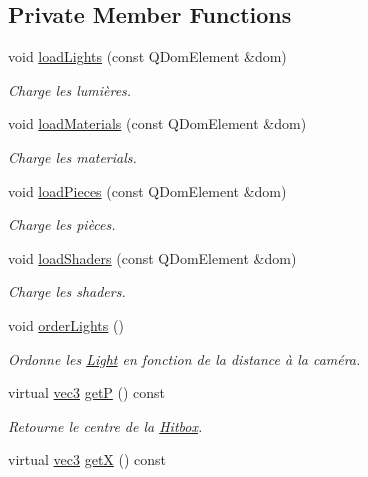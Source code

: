 \subsection*{Private Member Functions}
\begin{DoxyCompactItemize}
\item 
void \hyperlink{class_scene_a34446952ed460f5a66a90649d6f743ec}{load\+Lights} (const Q\+Dom\+Element \&dom)
\begin{DoxyCompactList}\small\item\em Charge les lumières. \end{DoxyCompactList}\item 
void \hyperlink{class_scene_a8fe39b5221775362f28c78129292e162}{load\+Materials} (const Q\+Dom\+Element \&dom)
\begin{DoxyCompactList}\small\item\em Charge les materials. \end{DoxyCompactList}\item 
void \hyperlink{class_scene_aa6d40bab1b160afc7bb84841d056a07d}{load\+Pieces} (const Q\+Dom\+Element \&dom)
\begin{DoxyCompactList}\small\item\em Charge les pièces. \end{DoxyCompactList}\item 
void \hyperlink{class_scene_a1deb5bb022836f4b585c8580246b26cb}{load\+Shaders} (const Q\+Dom\+Element \&dom)
\begin{DoxyCompactList}\small\item\em Charge les shaders. \end{DoxyCompactList}\item 
void \hyperlink{class_scene_ae6fc45f015d96191dbf775d54d6e4437}{order\+Lights} ()
\begin{DoxyCompactList}\small\item\em Ordonne les \hyperlink{class_light}{Light} en fonction de la distance à la caméra. \end{DoxyCompactList}\item 
virtual \hyperlink{structvec3}{vec3} \hyperlink{class_scene_a31be15d8114d6d9c01c312cbe1a41ed6}{get\+P} () const 
\begin{DoxyCompactList}\small\item\em Retourne le centre de la \hyperlink{class_hitbox}{Hitbox}. \end{DoxyCompactList}\item 
virtual \hyperlink{structvec3}{vec3} \hyperlink{class_scene_a1a35eb36ad2c6b5bf748c31933e4ea5b}{get\+X} () const 

\end{DoxyCompactItemize}
